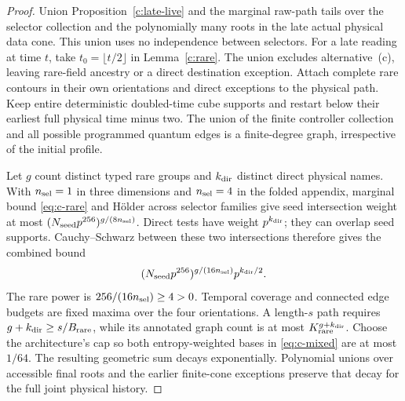 \begin{proof}
Union Proposition~\ref{c:late-live} and the marginal raw-path tails
over the selector collection and the polynomially many roots in the late actual
physical data cone. This union uses no independence between selectors.
For a late reading at time \(t\), take \(t_0=\lfloor t/2\rfloor\)
in Lemma~\ref{c:rare}. The union excludes alternative~(c), leaving
rare-field ancestry or a direct destination exception. Attach complete rare contours in
their own orientations and direct exceptions to the physical
path. Keep entire deterministic doubled-time cube supports and restart
below their earliest full physical time minus two. The union of the
finite controller collection and all possible programmed quantum edges is
a finite-degree graph, irrespective of the initial profile.

Let \(g\) count distinct typed rare groups and \(k_{\rm dir}\) distinct direct
physical names. With \(n_{\rm sel}=1\) in three dimensions and
\(n_{\rm sel}=4\) in the folded appendix, marginal bound \eqref{eq:c-rare} and
Hölder across selector families give seed intersection weight at most
\((N_{\rm seed}p^{256})^{g/(8n_{\rm sel})}\). Direct tests have weight
\(p^{k_{\rm dir}}\); they can overlap seed supports. Cauchy--Schwarz between
these two intersections therefore gives the combined bound
\begin{equation}\label{eq:c-mixed}
 (N_{\rm seed}p^{256})^{g/(16n_{\rm sel})}p^{k_{\rm dir}/2}.
\end{equation}
The rare power is \(256/(16n_{\rm sel})\ge4>0\). Temporal coverage and connected
edge budgets are fixed maxima over the four orientations. A length-\(s\)
path requires \(g+k_{\rm dir}\ge s/B_{\rm rare}\), while its annotated graph
count is at most \(K_{\rm rare}^{g+k_{\rm dir}}\). Choose the architecture's
cap so both entropy-weighted bases in \eqref{eq:c-mixed} are at most
\(1/64\). The resulting geometric sum decays exponentially. Polynomial
unions over accessible final roots and the earlier finite-cone
exceptions preserve that decay for the full joint physical history.
\end{proof}
